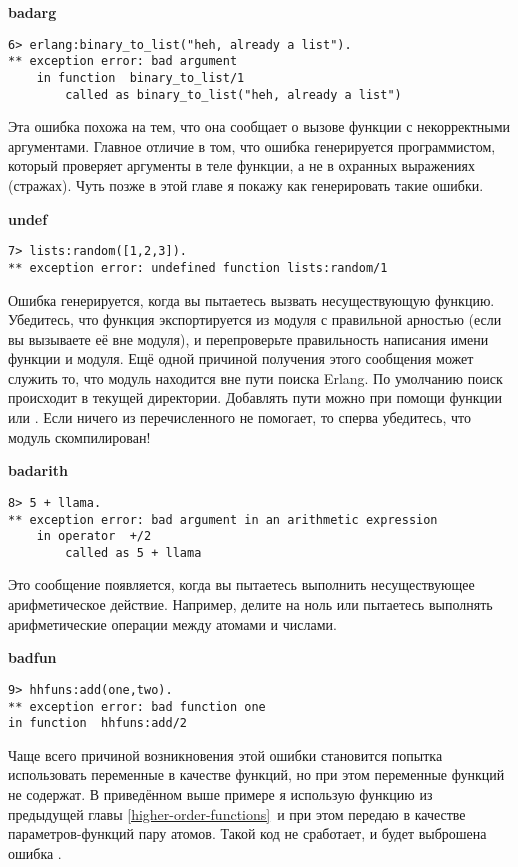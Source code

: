 \textbf{badarg}
\begin{lstlisting}[style=erlang]
6> erlang:binary_to_list("heh, already a list").
** exception error: bad argument
    in function  binary_to_list/1
        called as binary_to_list("heh, already a list")
\end{lstlisting}

Эта ошибка похожа на  тем, что она сообщает о вызове функции с некорректными аргументами.
Главное отличие в том, что ошибка генерируется программистом, который проверяет аргументы в теле функции, а не в охранных выражениях (стражах).
Чуть позже в этой главе я покажу как генерировать такие ошибки.
\blankline

\textbf{undef}
\begin{lstlisting}[style=erlang]
7> lists:random([1,2,3]).
** exception error: undefined function lists:random/1
\end{lstlisting}
Ошибка генерируется, когда вы пытаетесь вызвать несуществующую функцию.
Убедитесь, что функция экспортируется из модуля с правильной арностью (если вы вызываете её вне модуля), и перепроверьте правильность написания имени функции и модуля.
Ещё одной причиной получения этого сообщения может служить то, что модуль находится вне пути поиска Erlang.
По умолчанию поиск происходит в текущей директории. Добавлять пути можно при помощи функции  или .
Если ничего из перечисленного не помогает, то сперва убедитесь, что модуль скомпилирован!
\blankline

\textbf{badarith}
\begin{lstlisting}[style=erlang]
8> 5 + llama.
** exception error: bad argument in an arithmetic expression
    in operator  +/2
        called as 5 + llama
\end{lstlisting}

Это сообщение появляется, когда вы пытаетесь выполнить несуществующее арифметическое действие.
Например, делите на ноль или пытаетесь выполнять арифметические операции между атомами и числами.
\blankline

\textbf{badfun}
\begin{lstlisting}[style=erlang]
9> hhfuns:add(one,two).
** exception error: bad function one
in function  hhfuns:add/2
\end{lstlisting}
Чаще всего причиной возникновения этой ошибки становится попытка использовать переменные в качестве функций, но при этом переменные функций не содержат.
В приведённом выше примере я использую функцию  из предыдущей главы \ref{higher-order-functions}~и при этом передаю в качестве параметров\--функций пару атомов.
Такой код не сработает, и будет выброшена ошибка .
\blankline

